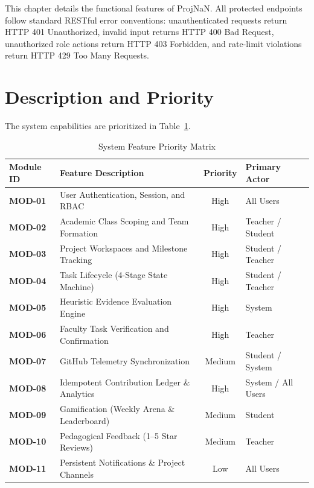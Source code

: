 \documentclass{scrreprt}
\begin{document}
This chapter details the functional features of ProjNaN. All protected endpoints follow standard RESTful error conventions: unauthenticated requests return HTTP 401 Unauthorized, invalid input returns HTTP 400 Bad Request, unauthorized role actions return HTTP 403 Forbidden, and rate-limit violations return HTTP 429 Too Many Requests.

\section{Description and Priority}\label{sec:feature_priority}
The system capabilities are prioritized in Table~\ref{tab:feature_priority}.

\begin{table}[H]
\centering
\begin{tabularx}{\textwidth}{|l|l|c|X|}
    \hline
    \textbf{Module ID} & \textbf{Feature Description} & \textbf{Priority} & \textbf{Primary Actor} \\
    \hline
    \textbf{MOD-01} & User Authentication, Session, and RBAC & High & All Users \\
    \textbf{MOD-02} & Academic Class Scoping and Team Formation & High & Teacher / Student \\
    \textbf{MOD-03} & Project Workspaces and Milestone Tracking & High & Student / Teacher \\
    \textbf{MOD-04} & Task Lifecycle (4-Stage State Machine) & High & Student / Teacher \\
    \textbf{MOD-05} & Heuristic Evidence Evaluation Engine & High & System \\
    \textbf{MOD-06} & Faculty Task Verification and Confirmation & High & Teacher \\
    \textbf{MOD-07} & GitHub Telemetry Synchronization & Medium & Student / System \\
    \textbf{MOD-08} & Idempotent Contribution Ledger \& Analytics & High & System / All Users \\
    \textbf{MOD-09} & Gamification (Weekly Arena \& Leaderboard) & Medium & Student \\
    \textbf{MOD-10} & Pedagogical Feedback (1--5 Star Reviews) & Medium & Teacher \\
    \textbf{MOD-11} & Persistent Notifications \& Project Channels & Low & All Users \\
    \hline
\end{tabularx}
\caption{System Feature Priority Matrix}
\label{tab:feature_priority}
\end{table}
\end{document}

